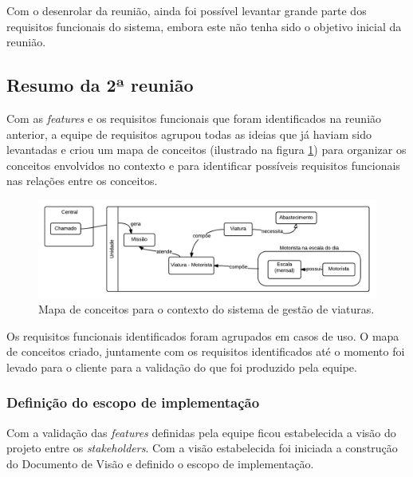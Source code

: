       Com o desenrolar da reunião, ainda foi possível levantar grande parte dos requisitos funcionais do sistema, embora este não tenha
      sido o objetivo inicial da reunião.
      
    \subsection{Resumo da 2ª reunião}
    
      Com as \textit{features} e os requisitos funcionais que foram identificados na reunião anterior, a equipe de requisitos 
      agrupou todas as ideias que já haviam sido levantadas e criou um mapa de conceitos (ilustrado na figura \ref{mapa_conceitos})
      para organizar os conceitos envolvidos no contexto e para identificar possíveis requisitos funcionais nas relações entre os 
      conceitos.
            
      \begin{figure}[!htbp]
	\centering
	\includegraphics[scale=0.4]{figuras/mapa_conceitos}
	\caption[Mapa de conceitos para o contexto do sistema de gestão de viaturas]
	  {Mapa de conceitos para o contexto do sistema de gestão de viaturas.}
	\label{mapa_conceitos}
      \end{figure}
      
      Os requisitos funcionais identificados foram agrupados em casos de uso.
      O mapa de conceitos criado, juntamente com os requisitos identificados até o momento foi levado para o cliente para a
      validação do que foi produzido pela equipe.
      
      \subsubsection{Definição do escopo de implementação}
      
	Com a validação das \textit{features} definidas pela equipe ficou estabelecida a visão do projeto entre os
	\textit{stakeholders}. Com a visão estabelecida foi iniciada a construção do Documento de Visão e definido o
	escopo de implementação.
		
